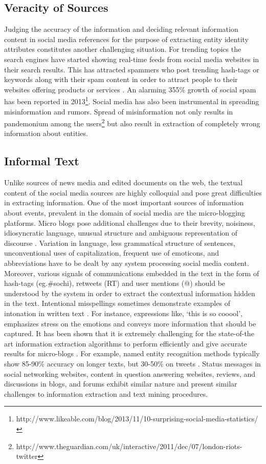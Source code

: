 \subsection{Veracity of Sources}
Judging the accuracy of the information and deciding relevant information content in social media references for the purpose of extracting entity identity attributes constitutes another challenging situation. For trending topics the search engines have started showing real-time feeds from social media websites in their search results. This has attracted spammers who post trending hash-tags or keywords along with their spam content in order to attract people to their websites offering products or services \cite{benevenuto2010detecting}. An alarming 355\% growth of social spam has been reported in 2013\footnote{http://www.likeable.com/blog/2013/11/10-surprising-social-media-statistics/}. Social media has also been instrumental in spreading misinformation and rumors. Spread of misinformation not only results in pandemonium among the users\footnote{http://www.theguardian.com/uk/interactive/2011/dec/07/london-riots-twitter}  but also result in extraction of completely wrong information about entities.

\subsection{Informal Text}
Unlike sources of news media and edited documents on the web, the textual content of the social media sources are highly colloquial and pose great difficulties in extracting information. One of the most important sources of information about events, prevalent in the domain of social media are the micro-blogging platforms. Micro blogs pose additional challenges due to their brevity, noisiness, idiosyncratic language, unusual structure and ambiguous representation of discourse \cite{bontcheva2013twitie}. Variation in language, less grammatical structure of sentences, unconventional uses of capitalization, frequent use of emoticons, and abbreviations have to be dealt by any system processing social media content. Moreover, various signals of communications embedded in the text in the form of hash-tags (eg.\#sochi), retweets (RT) and user mentions (@) should be understood by the system in order to extract the contextual information hidden in the text. Intentional misspellings sometimes demonstrate examples of intonation in written text \cite{prevost1996information}. For instance, expressions like, `this is so cooool', emphasizes stress on the emotions and conveys more information that should be captured. It has been shown that it is extremely challenging for the state-of-the art information extraction algorithms to perform efficiently and give accurate results for micro-blogs \cite{derczynski2013microblog}. For example, named entity recognition methods typically show 85-90\% accuracy on longer texts, but 30-50\% on tweets \cite{ritter2011named}. Status messages in social networking websites, content in question answering websites, reviews, and discussions in blogs, and forums exhibit similar nature and present similar challenges to information extraction and text mining procedures.



